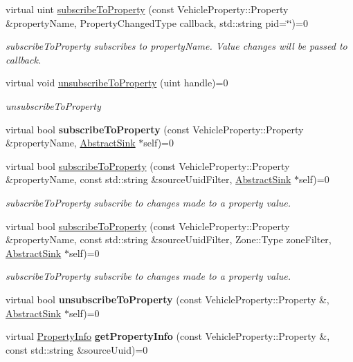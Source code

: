 \begin{DoxyCompactItemize}
\item 
virtual uint \hyperlink{classAbstractRoutingEngine_a7a30b4c21f91ce6586e1575458238809}{subscribe\-To\-Property} (const Vehicle\-Property\-::\-Property \&property\-Name, Property\-Changed\-Type callback, std\-::string pid=\char`\"{}\char`\"{})=0
\begin{DoxyCompactList}\small\item\em subscribe\-To\-Property subscribes to property\-Name. Value changes will be passed to callback. \end{DoxyCompactList}\item 
virtual void \hyperlink{classAbstractRoutingEngine_aa56c145aa682ece99791831bc7c420f7}{unsubscribe\-To\-Property} (uint handle)=0
\begin{DoxyCompactList}\small\item\em unsubscribe\-To\-Property \end{DoxyCompactList}\item 
\hypertarget{classAbstractRoutingEngine_a1714228e3ef96be7f5a50811b516c352}{virtual bool {\bfseries subscribe\-To\-Property} (const Vehicle\-Property\-::\-Property \&property\-Name, \hyperlink{classAbstractSink}{Abstract\-Sink} $\ast$self)=0}\label{classAbstractRoutingEngine_a1714228e3ef96be7f5a50811b516c352}

\item 
virtual bool \hyperlink{classAbstractRoutingEngine_aae6c5d27dc01b4773b6bf77331f86e9f}{subscribe\-To\-Property} (const Vehicle\-Property\-::\-Property \&property\-Name, const std\-::string \&source\-Uuid\-Filter, \hyperlink{classAbstractSink}{Abstract\-Sink} $\ast$self)=0
\begin{DoxyCompactList}\small\item\em subscribe\-To\-Property subscribe to changes made to a property value. \end{DoxyCompactList}\item 
virtual bool \hyperlink{classAbstractRoutingEngine_ac64ad6ac6a1fcd6ce7ad190262176466}{subscribe\-To\-Property} (const Vehicle\-Property\-::\-Property \&property\-Name, const std\-::string \&source\-Uuid\-Filter, Zone\-::\-Type zone\-Filter, \hyperlink{classAbstractSink}{Abstract\-Sink} $\ast$self)=0
\begin{DoxyCompactList}\small\item\em subscribe\-To\-Property subscribe to changes made to a property value. \end{DoxyCompactList}\item 
\hypertarget{classAbstractRoutingEngine_a23c16d50214f36e08383cfec64e1f569}{virtual bool {\bfseries unsubscribe\-To\-Property} (const Vehicle\-Property\-::\-Property \&, \hyperlink{classAbstractSink}{Abstract\-Sink} $\ast$self)=0}\label{classAbstractRoutingEngine_a23c16d50214f36e08383cfec64e1f569}

\item 
\hypertarget{classAbstractRoutingEngine_aa54d896b08870c24ae503a347681a439}{virtual \hyperlink{classPropertyInfo}{Property\-Info} {\bfseries get\-Property\-Info} (const Vehicle\-Property\-::\-Property \&, const std\-::string \&source\-Uuid)=0}\label{classAbstractRoutingEngine_aa54d896b08870c24ae503a347681a439}

\end{DoxyCompactItemize}

